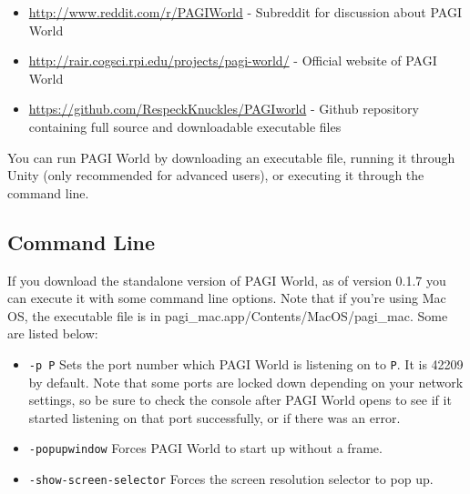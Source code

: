 \documentclass[11pt]{article}
\begin{document}
\begin{itemize}
\item \url{http://www.reddit.com/r/PAGIWorld} - Subreddit for discussion about PAGI World
\item \url{http://rair.cogsci.rpi.edu/projects/pagi-world/} - Official website of PAGI World
\item \url{https://github.com/RespeckKnuckles/PAGIworld} - Github repository containing full source and downloadable executable files
\end{itemize}

You can run PAGI World by downloading an executable file, running it through Unity (only recommended for advanced users), or executing it through the command line.

\subsection{Command Line}

If you download the standalone version of PAGI World, as of version 0.1.7 you can execute it with some command line options. Note that if you're using Mac OS, the executable file is in pagi\_mac.app/Contents/MacOS/pagi\_mac. Some are listed below:

\begin{itemize}
\item \texttt{-p P} Sets the port number which PAGI World is listening on to \texttt{P}. It is 42209 by default. Note that some ports are locked down depending on your network settings, so be sure to check the console after PAGI World opens to see if it started listening on that port successfully, or if there was an error.
\item \texttt{-popupwindow} Forces PAGI World to start up without a frame.
\item \texttt{-show-screen-selector} Forces the screen resolution selector to pop up.
\end{itemize}



%

%

%

%

%



\end{document}
